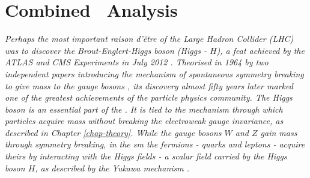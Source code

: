 \chapter[\color{oxfordblue} \boldvhbc\ Combined Analysis]{\color{oxfordblue} Combined \vhbc\ Analysis}\label{chap-VH}
\ChapFrame

\textit{Perhaps the most important \textit{raison d'être} of the \textit{Large Hadron Collider} (LHC) was to discover the Brout-Englert-Higgs boson (Higgs - $H$), a feat achieved by the ATLAS and CMS Experiments in July 2012 \cite{ATLAS:2012yve, CMS:2012qbp}. Theorised in 1964 by two independent papers introducing the mechanism of spontaneous symmetry breaking to give mass to the gauge bosons \cite{Englert:1964et,  PhysRevLett.13.508}, its discovery almost fifty years later marked one of the greatest achievements of the particle physics community. The Higgs boson is an essential part of the . It is tied to the mechanism through which particles acquire mass without breaking the electroweak gauge invariance, as described in Chapter \ref{chap-theory}. While the gauge bosons $W$ and $Z$ gain mass through symmetry breaking, in the \gls{sm} the fermions - quarks and leptons - acquire theirs by interacting with the Higgs fields - a scalar field carried by the Higgs boson $H$, as described by the Yukawa mechanism \cite{10.1143/PTPS.1.1}.}\\

